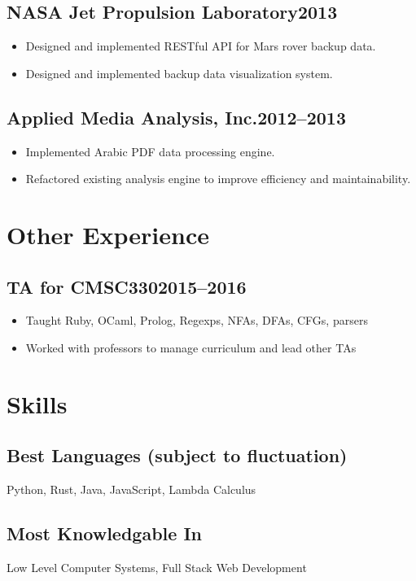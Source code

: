 \documentclass[letterpaper]{article}
\newcommand{\subsectiondate}[2]{\subsection*{#1\hfill#2}}
\begin{document}
\subsectiondate{NASA Jet Propulsion Laboratory}{2013}

\begin{itemize}
    \item Designed and implemented RESTful API for Mars rover backup data.
    \item Designed and implemented backup data visualization system.
\end{itemize}

\subsectiondate{Applied Media Analysis, Inc.}{2012--2013}

\begin{itemize}
    \item Implemented Arabic PDF data processing engine.
    \item Refactored existing analysis engine to improve efficiency and maintainability.
\end{itemize}


\section*{Other Experience}

\subsectiondate{TA for CMSC330}{2015--2016}

\begin{itemize}
    \item Taught Ruby, OCaml, Prolog, Regexps, NFAs, DFAs, CFGs, parsers
    \item Worked with professors to manage curriculum and lead other TAs
\end{itemize}

\section*{Skills}

\subsection*{Best Languages (subject to fluctuation)}
Python, Rust, Java, JavaScript, Lambda Calculus

\subsection*{Most Knowledgable In}
Low Level Computer Systems, Full Stack Web Development
\end{document}

